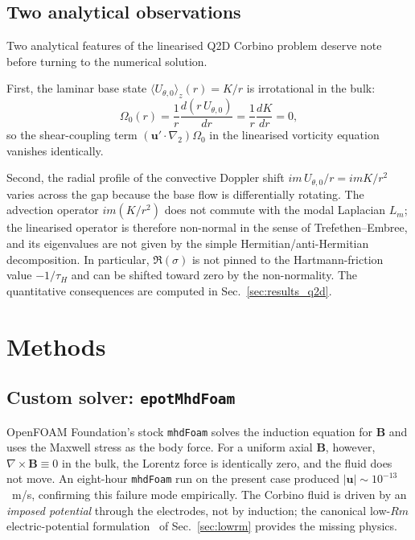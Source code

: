 \documentclass[aps,prl,twocolumn,superscriptaddress]{revtex4-2}
\begin{document}
\subsection{Two analytical observations}
\label{sec:q2d_obs}

Two analytical features of the linearised Q2D Corbino problem deserve
note before turning to the numerical solution.

First, the laminar base state $\langle U_{\theta,0}\rangle_{z}(r)
= K/r$ is irrotational in the bulk:
\begin{equation}
\Omega_{0}(r) = \frac{1}{r}\frac{d(r\,U_{\theta,0})}{dr}
   = \frac{1}{r}\frac{dK}{dr} = 0,
\label{eq:omega0_zero}
\end{equation}
so the shear-coupling term
$(\mathbf{u}'\!\cdot\!\nabla_{2})\Omega_{0}$ in the linearised
vorticity equation vanishes identically.

Second, the radial profile of the convective Doppler shift
$im\,U_{\theta,0}/r = imK/r^{2}$ varies across the gap because the
base flow is differentially rotating.  The advection operator
$im(K/r^{2})$ does not commute with the modal Laplacian $L_{m}$; the
linearised operator is therefore non-normal in the sense of
Trefethen--Embree, and its eigenvalues are not given by the simple
Hermitian/anti-Hermitian decomposition.  In particular,
$\Re(\sigma)$ is not pinned to the Hartmann-friction value $-1/\tau_H$
and can be shifted toward zero by the non-normality.  The
quantitative consequences are computed in Sec.~\ref{sec:results_q2d}.


\section{Methods}

\subsection{Custom solver: \texttt{epotMhdFoam}}

OpenFOAM Foundation's stock \texttt{mhdFoam} solves the induction
equation for $\mathbf{B}$ and uses the Maxwell stress as the body
force.  For a uniform axial $\mathbf{B}$, however,
$\nabla\!\times\!\mathbf{B}\equiv 0$ in the bulk, the Lorentz force is
identically zero, and the fluid does not move.  An eight-hour
\texttt{mhdFoam} run on the present case produced
$|\mathbf{u}|\sim 10^{-13}$~m/s, confirming this failure mode
empirically.  The Corbino fluid is driven by an \emph{imposed
potential} through the electrodes, not by induction; the canonical
low-$Rm$ electric-potential formulation~\cite{1,2} of
Sec.~\ref{sec:lowrm} provides the missing physics.
\end{document}
